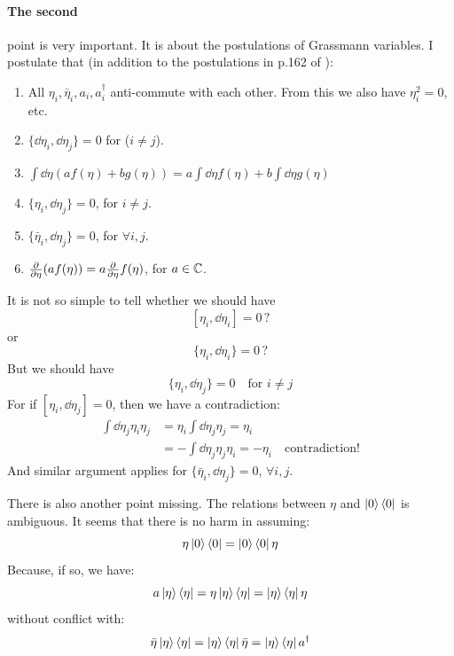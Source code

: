 \documentclass{article}
\begin{document}
\paragraph{The second} point is very important. It is about the postulations of
Grassmann variables. I postulate that (in addition to the postulations in p.162
of \cite{Altland2010}):
\begin{enumerate}
    \item All $\eta_i,\bar{\eta}_i,a_i,a^\dagger_i$ anti-commute with each
        other. From this we also have $\eta_i^2=0$, etc.
    \item $\{\dd \eta_i,\dd\eta_j\}=0$ for ($i\neq j$).
    \item $\int \dd{\eta} (af(\eta) + bg(\eta) )
        = a\int\dd{\eta}f(\eta) + b\int\dd{\eta}g(\eta) $
    \item $\{\eta_i,\dd{\eta_j}\}=0$, for $i\neq j$.
    \item $\{\bar{\eta}_i,\dd{\eta_j}\}=0$, for $\forall i,j$.
    \item $\pdv{\eta} (af(\eta)) = a\pdv{\eta}f(\eta)$, for $a\in\mathbb{C}$.
\end{enumerate}
It is not so simple to tell whether we should have 
$$[\eta_i,\dd\eta_i]=0 \,\text{?}$$ or
$$\{\eta_i,\dd\eta_i\}=0\,\text{?}$$
But we should have 
$$\{\eta_i,\dd{\eta_j}\}=0 \quad\text{for $i\neq j$} $$
For if $[\eta_i,\dd{\eta_j}]=0$, then we have a contradiction:
\begin{align}
    \int\dd{\eta_j} \eta_i\eta_j &= \eta_i \int\dd{\eta_j}\eta_j = \eta_i
    \nonumber\\
    &= -\int\dd{\eta_j}\eta_j \eta_i = -\eta_i\quad \text{contradiction!}
\end{align}
And similar argument applies for $\{\bar{\eta}_i,\dd{\eta_j}\}=0$, $\forall
i,j$.

There is also another point missing. The relations between $\eta$ and
$\ket{0}\bra{0}$ is ambiguous. It seems that there is no harm in assuming:
\begin{equation}
    \eta \ket{0}\bra{0} = \ket{0}\bra{0}\eta
\end{equation}
Because, if so, we have:
\begin{equation}
    a\ket{\eta}\bra{\eta} = \eta\ket{\eta}\bra{\eta} = \ket{\eta}\bra{\eta}\eta
\end{equation}
without conflict with:
\begin{equation}
    \bar{\eta}\ket{\eta}\bra{\eta} = \ket{\eta}\bra{\eta}\bar{\eta} =
    \ket{\eta}\bra{\eta} a^\dagger
\end{equation}
\end{document}
